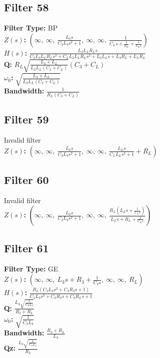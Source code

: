 \documentclass{article}
\begin{document}
\subsection*{Filter 58}
\textbf{Filter Type:} BP \\ 
\textbf{$Z(s)$:} $\left( \infty, \  \infty, \  \frac{L_{3} s}{C_{3} L_{3} s^{2} + 1}, \  \infty, \  \infty, \  \frac{1}{C_{L} s + \frac{1}{R_{L}} + \frac{1}{L_{L} s}}\right)$ \\ 
\textbf{$H(s)$:} $\frac{L_{3} L_{L} R_{L} s}{C_{3} L_{3} L_{L} R_{L} s^{2} + C_{L} L_{3} L_{L} R_{L} s^{2} + L_{3} L_{L} s + L_{3} R_{L} + L_{L} R_{L}}$ \\ 
\textbf{Q:} $R_{L} \sqrt{\frac{L_{3} + L_{L}}{L_{3} L_{L} \left(C_{3} + C_{L}\right)}} \left(C_{3} + C_{L}\right)$ \\ 
\textbf{$\omega_0$:} $\sqrt{\frac{L_{3} + L_{L}}{L_{3} L_{L} \left(C_{3} + C_{L}\right)}}$ \\ 
\textbf{Bandwidth:} $\frac{1}{R_{L} \left(C_{3} + C_{L}\right)}$ \\ 
\subsection*{Filter 59}
Invalid filter \\ 
\textbf{$Z(s)$:} $\left( \infty, \  \infty, \  \frac{L_{3} s}{C_{3} L_{3} s^{2} + 1}, \  \infty, \  \infty, \  \frac{L_{L} s}{C_{L} L_{L} s^{2} + 1} + R_{L}\right)$ \\ 
\subsection*{Filter 60}
Invalid filter \\ 
\textbf{$Z(s)$:} $\left( \infty, \  \infty, \  \frac{L_{3} s}{C_{3} L_{3} s^{2} + 1}, \  \infty, \  \infty, \  \frac{R_{L} \left(L_{L} s + \frac{1}{C_{L} s}\right)}{L_{L} s + R_{L} + \frac{1}{C_{L} s}}\right)$ \\ 
\subsection*{Filter 61}
\textbf{Filter Type:} GE \\ 
\textbf{$Z(s)$:} $\left( \infty, \  \infty, \  L_{3} s + R_{3} + \frac{1}{C_{3} s}, \  \infty, \  \infty, \  R_{L}\right)$ \\ 
\textbf{$H(s)$:} $\frac{R_{L} \left(C_{3} L_{3} s^{2} + C_{3} R_{3} s + 1\right)}{C_{3} L_{3} s^{2} + C_{3} R_{3} s + C_{3} R_{L} s + 1}$ \\ 
\textbf{Q:} $\frac{L_{3} \sqrt{\frac{1}{C_{3} L_{3}}}}{R_{3} + R_{L}}$ \\ 
\textbf{$\omega_0$:} $\sqrt{\frac{1}{C_{3} L_{3}}}$ \\ 
\textbf{Bandwidth:} $\frac{R_{3} + R_{L}}{L_{3}}$ \\ 
\textbf{Qz:} $\frac{L_{3} \sqrt{\frac{1}{C_{3} L_{3}}}}{R_{3}}$ \\ 
\end{document}
